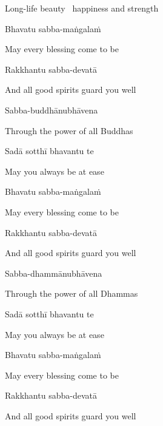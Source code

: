\begin{english}
  Long-life beauty \breathmark\ happiness and strength
\end{english}

Bhavatu sabba-maṅgalaṁ

\begin{english}
  May every blessing come to be
\end{english}

Rakkhantu sabba-devatā

\begin{english}
  And all good spirits guard you well
\end{english}

Sabba-buddhānubhāvena

\begin{english}
  Through the power of all Buddhas
\end{english}

Sadā sotthī bhavantu te

\begin{english}
  May you always be at ease
\end{english}

Bhavatu sabba-maṅgalaṁ

\begin{english}
  May every blessing come to be
\end{english}

Rakkhantu sabba-devatā

\begin{english}
  And all good spirits guard you well
\end{english}

Sabba-dhammānubhāvena

\begin{english}
  Through the power of all Dhammas
\end{english}

Sadā sotthī bhavantu te

\begin{english}
  May you always be at ease
\end{english}

Bhavatu sabba-maṅgalaṁ

\begin{english}
  May every blessing come to be
\end{english}

Rakkhantu sabba-devatā

\begin{english}
  And all good spirits guard you well
\end{english}

